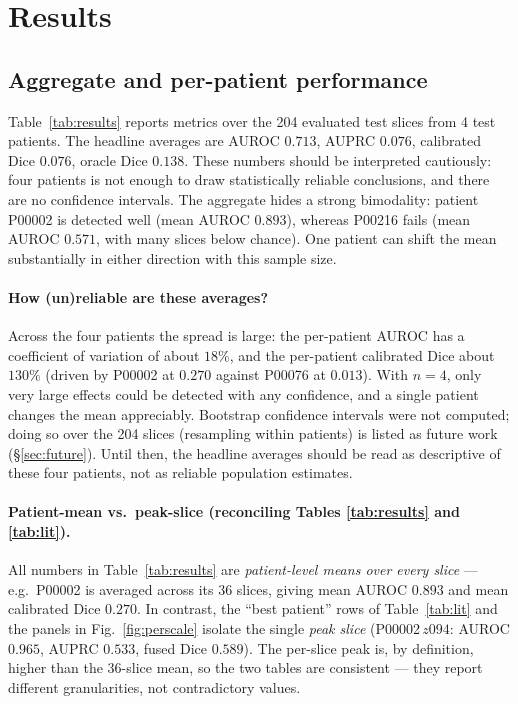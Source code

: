 \documentclass[12pt, a4paper]{article}
\theoremstyle{definition}\newtheorem{definition}{Definition}
\begin{document}
\section{Results}
\subsection{Aggregate and per-patient performance}
Table~\ref{tab:results} reports metrics over the 204 evaluated test slices from 4 test
patients. The headline averages are AUROC $0.713$, AUPRC $0.076$, calibrated Dice
$0.076$, oracle Dice $0.138$. These numbers should be interpreted cautiously: four
patients is not enough to draw statistically reliable conclusions, and there are no
confidence intervals. The aggregate hides a strong bimodality: patient P00002 is
detected well (mean AUROC $0.893$), whereas P00216 fails (mean AUROC $0.571$, with
many slices below chance). One patient can shift the mean substantially in either
direction with this sample size.

\paragraph{How (un)reliable are these averages?} Across the four patients the spread is
large: the per-patient AUROC has a coefficient of variation of about $18\%$, and the
per-patient calibrated Dice about $130\%$ (driven by P00002 at $0.270$ against P00076 at
$0.013$). With $n=4$, only very large effects could be detected with any confidence, and
a single patient changes the mean appreciably. Bootstrap confidence intervals were not
computed; doing so over the 204 slices (resampling within patients) is listed as future
work (\S\ref{sec:future}). Until then, the headline averages should be read as
descriptive of these four patients, not as reliable population estimates.

\paragraph{Patient-mean vs.\ peak-slice (reconciling Tables \ref{tab:results} and
\ref{tab:lit}).} All numbers in Table~\ref{tab:results} are \emph{patient-level
means over every slice} --- e.g.\ P00002 is averaged across its 36 slices, giving
mean AUROC $0.893$ and mean calibrated Dice $0.270$. In contrast, the ``best
patient'' rows of Table~\ref{tab:lit} and the panels in Fig.~\ref{fig:perscale}
isolate the single \emph{peak slice} (P00002\,$z094$: AUROC $0.965$, AUPRC $0.533$,
fused Dice $0.589$). The per-slice peak is, by definition, higher than the 36-slice
mean, so the two tables are consistent --- they report different granularities, not
contradictory values.
\end{document}
